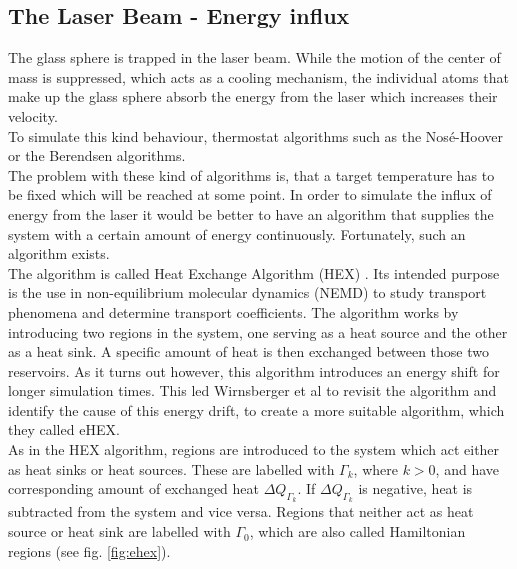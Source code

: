 \documentclass[12pt]{article}
\begin{document}
\subsection{The Laser Beam - Energy influx}
The glass sphere is trapped in the laser beam. While the motion of the center of mass is suppressed, which acts as a cooling mechanism, the
individual atoms that make up the glass sphere absorb the energy from the laser which increases their velocity.\\
To simulate this kind behaviour, thermostat algorithms \cite{Huenenberger2005} such as the Nos\'e-Hoover \cite{Nose1984,Hoover1985} or the Berendsen
\cite{Berendsen1984} algorithms.\\
The problem with these kind of algorithms is, that a target temperature has to be fixed which will be reached at some point. In order to simulate the
influx of energy from the laser it would be better to have an algorithm that supplies the system with a certain amount of energy continuously.
Fortunately, such an algorithm exists.\\
The algorithm is called Heat Exchange Algorithm (HEX) \cite{Hafskjold1993}. Its intended purpose is the use in non-equilibrium molecular dynamics
(NEMD) to study transport phenomena and determine transport coefficients. The algorithm works by introducing two regions in the system, one serving as
a heat source and the other as a heat sink. A specific amount of heat is then exchanged between those two reservoirs. As it turns out however, this
algorithm introduces an energy shift for longer simulation times. This led Wirnsberger et al \cite{Wirnsberger2015} to revisit the algorithm and 
identify the cause of this energy drift, to create a more suitable algorithm, which they called eHEX.\\
As in the HEX algorithm, regions are introduced to the system which act either as heat sinks or heat sources. These are labelled with $\Gamma_k$,
where $k > 0$, and have corresponding amount of exchanged heat $\Delta Q_{\Gamma_k}$. If $\Delta Q_{\Gamma_k}$ is negative, heat is subtracted from
the system and vice versa. Regions that neither act as heat source or heat sink are labelled with $\Gamma_0$, which are also called
Hamiltonian regions (see fig. \ref{fig:ehex}). 
\end{document}
